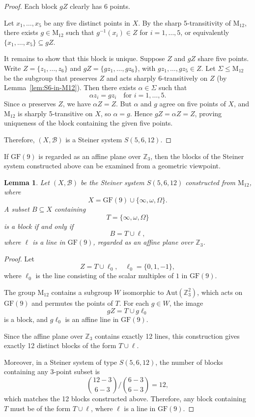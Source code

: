 \documentclass[12pt,a4paper,openany]{book}
\newtheorem{lemma}{Lemma}[section]
\newcommand{\GF}{\mathrm{GF}}
\newcommand{\Aut}{\mathrm{Aut}}
\newcommand{\Z}{\mathbb{Z}}
\begin{document}
\begin{proof}
Each block $gZ$ clearly has 6 points. 

Let $x_1, \dots, x_5$ be any five distinct points in $X$. By the sharp 5-transitivity of $\mathrm{M}_{12}$, there exists $g \in \mathrm{M}_{12}$ such that $g^{-1}(x_i) \in Z$ for $i=1,\dots,5$, or equivalently $\{x_1, \dots, x_5\} \subseteq gZ$. 

It remains to show that this block is unique. Suppose $Z$ and $gZ$ share five points. Write $Z = \{z_1, \dots, z_6\}$ and $gZ = \{g z_1, \dots, g z_6\}$, with $g z_1, \dots, g z_5 \in Z$. Let $\Sigma \leq \mathrm{M}_{12}$ be the subgroup that preserves $Z$ and acts sharply 6-transitively on $Z$ (by Lemma~\ref{lem:S6-in-M12}). Then there exists $\alpha \in \Sigma$ such that 
\[
\alpha z_i = g z_i \quad \text{for } i=1,\dots,5.
\] 
Since $\alpha$ preserves $Z$, we have $\alpha Z = Z$. But $\alpha$ and $g$ agree on five points of $X$, and $\mathrm{M}_{12}$ is sharply 5-transitive on $X$, so $\alpha = g$. Hence $gZ = \alpha Z = Z$, proving uniqueness of the block containing the given five points.

Therefore, $(X, \mathscr{B})$ is a Steiner system $S(5, 6, 12)$.
\end{proof}


If $\GF(9)$ is regarded as an affine plane over $\Z_3$, then the blocks of the Steiner system constructed above can be examined from a geometric viewpoint.

\begin{lemma}\label{lem:block-structure}
Let $(X, \mathscr{B})$ be the Steiner system $S(5,6,12)$ constructed from $\mathrm{M}_{12}$, where 
\[
X = \GF(9) \cup \{\infty, \omega, \Omega\}.
\] 
A subset $B \subseteq X$ containing 
\[
T = \{\infty, \omega, \Omega\}
\] 
is a block if and only if 
\[
B = T \cup \ell,
\] 
where $\ell$ is a line in $\GF(9)$, regarded as an affine plane over $\Z_3$.
\end{lemma}

\begin{proof}
Let 
\[
Z = T \cup \ell_0, \quad \ell_0 = \{0, 1, -1\},
\] 
where $\ell_0$ is the line consisting of the scalar multiples of $1$ in $\GF(9)$.

The group $\mathrm{M}_{12}$ contains a subgroup $W$ isomorphic to $\Aut(\Z_3^2)$, which acts on $\GF(9)$ and permutes the points of $T$. For each $g \in W$, the image 
\[
gZ = T \cup g\ell_0
\] 
is a block, and $g\ell_0$ is an affine line in $\GF(9)$.

Since the affine plane over $\Z_3$ contains exactly 12 lines, this construction gives exactly 12 distinct blocks of the form $T \cup \ell$.

Moreover, in a Steiner system of type $S(5,6,12)$, the number of blocks containing any 3-point subset is 
\[
\binom{12-3}{6-3} / \binom{6-3}{6-3} = 12,
\] 
which matches the 12 blocks constructed above. Therefore, any block containing $T$ must be of the form $T \cup \ell$, where $\ell$ is a line in $\GF(9)$.
\end{proof}
\end{document}
